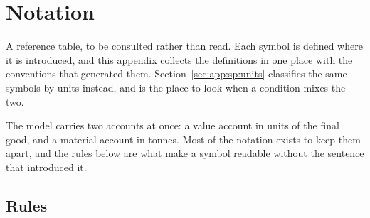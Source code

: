 \section{Notation}\label{sec:app:notation}

A reference table, to be consulted rather than read. Each symbol is defined where it is introduced, and
this appendix collects the definitions in one place with the conventions that generated them.
Section~\ref{sec:app:sp:units} classifies the same symbols by units instead, and is the place to look
when a condition mixes the two.

The model carries two accounts at once: a value account in units of the final good, and a material
account in tonnes. Most of the notation exists to keep them apart, and the rules below are what make a
symbol readable without the sentence that introduced it.

\subsection{Rules}\label{sec:app:notation:rules}

